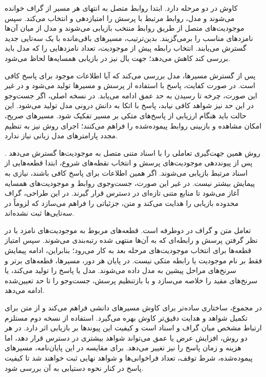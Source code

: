 کاوش در  دو مرحله دارد. ابتدا روابط متصل به انتهای هر مسیر از گراف خوانده می‌شوند و مدل، روابط مرتبط با پرسش را امتیازدهی و انتخاب می‌کند. سپس موجودیت‌های متصل از طریق روابط منتخب بازیابی می‌شوند و مدل از میان آن‌ها نامزدهای مناسب را برمی‌گزیند. بدین‌ترتیب، مسیرهای باقی‌مانده با یک سه‌تایی جدید گسترش می‌یابند. انتخاب رابطه پیش از موجودیت، تعداد نامزدهایی را که مدل باید بررسی کند کاهش می‌دهد؛ جهت یال نیز در بازیابی همسایه‌ها لحاظ می‌شود.

پس از گسترش مسیرها، مدل بررسی می‌کند که آیا اطلاعات موجود برای پاسخ کافی است. در صورت کفایت، پاسخ با استفاده از پرسش و مسیرها تولید می‌شود و در غیر این صورت، چرخه تا رسیدن به حد عمق ادامه می‌یابد. در نسخه اصلی، اگر جست‌وجو در این حد نیز شواهد کافی نیابد، پاسخ با اتکا به دانش درونی مدل تولید می‌شود. این حالت باید هنگام ارزیابی از پاسخ‌های متکی بر مسیر تفکیک شود. مسیرهای صریح، امکان مشاهده و بازبینی روابط پیموده‌شده را فراهم می‌کنند؛ اجرای روش نیز به تنظیم مجدد پارامترهای مدل زبانی نیاز ندارد.

روش  همین جهت‌گیری تعاملی را با اسناد متنی متصل به موجودیت‌ها گسترش می‌دهد \cite{ma2025tog2}. پس از پیونددهی موجودیت‌های پرسش و انتخاب نقطه‌های شروع، ابتدا قطعه‌هایی از اسناد مرتبط بازیابی می‌شوند. اگر همین اطلاعات برای پاسخ کافی باشند، نیازی به پیمایش بیشتر نیست. در غیر این صورت، جست‌وجوی روابط و موجودیت‌های همسایه آغاز می‌شود تا منابع متنی تازه‌ای در دسترس قرار گیرند. در این طراحی، گراف محدوده بازیابی را هدایت می‌کند و متن، جزئیاتی را فراهم می‌سازد که لزوماً در سه‌تایی‌ها ثبت نشده‌اند.

تعامل متن و گراف در  دوطرفه است. قطعه‌های مربوط به موجودیت‌های نامزد با در نظر گرفتن پرسش و رابطه‌ای که به آن‌ها منتهی شده رتبه‌بندی می‌شوند. سپس امتیاز قطعه‌ها برای انتخاب موجودیت‌های مرحله بعد به کار می‌رود؛ بنابراین، ادامه پیمایش فقط بر نام موجودیت یا رابطه متکی نیست. در پایان هر دور، مسیرها، قطعه‌های برتر و سرنخ‌های مراحل پیشین به مدل داده می‌شوند. مدل یا پاسخ را تولید می‌کند، یا سرنخ‌های مفید را خلاصه می‌سازد و با بازتنظیم پرسش، جست‌وجو را تا حد تعیین‌شده ادامه می‌دهد.

در مجموع،  ساختاری ساده‌تر برای کاوش مسیرهای دانشی فراهم می‌کند و  از متن برای تکمیل شواهد و هدایت دقیق‌تر کاوش بهره می‌گیرد. استفاده از نسخه دوم مستلزم ارتباط مشخص میان گراف و اسناد است و کیفیت این پیوندها بر بازیابی اثر دارد. در هر دو روش، افزایش عرض یا عمق می‌تواند شواهد بیشتری در دسترس قرار دهد، اما هزینه و زمان پاسخ را نیز تغییر می‌دهد. برای مقایسه در این پایان‌نامه، مسیرهای پیموده‌شده، شرط توقف، تعداد فراخوانی‌ها و شواهد نهایی ثبت خواهند شد تا کیفیت پاسخ در کنار نحوه دستیابی به آن بررسی شود.

